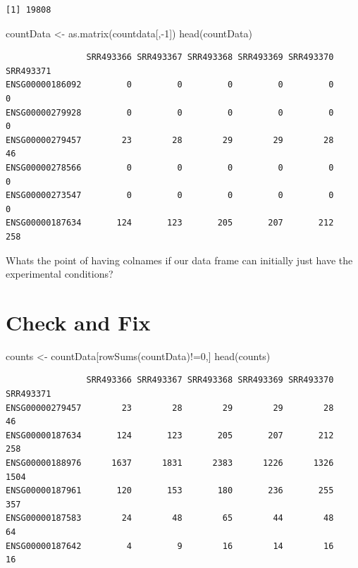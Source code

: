 \documentclass[
  letterpaper,
  DIV=11,
  numbers=noendperiod]{scrartcl}
\newenvironment{Shaded}{\begin{snugshade}}{\end{snugshade}}
\newcommand{\DecValTok}[1]{\textcolor[rgb]{0.68,0.00,0.00}{#1}}
\newcommand{\FunctionTok}[1]{\textcolor[rgb]{0.28,0.35,0.67}{#1}}
\newcommand{\NormalTok}[1]{\textcolor[rgb]{0.00,0.23,0.31}{#1}}
\newcommand{\OtherTok}[1]{\textcolor[rgb]{0.00,0.23,0.31}{#1}}
\newcommand{\SpecialCharTok}[1]{\textcolor[rgb]{0.37,0.37,0.37}{#1}}
\begin{document}
\begin{Shaded}
\end{Shaded}

\begin{verbatim}
[1] 19808
\end{verbatim}

\begin{Shaded}
\begin{Highlighting}[]
\NormalTok{countData }\OtherTok{\textless{}{-}} \FunctionTok{as.matrix}\NormalTok{(countdata[,}\SpecialCharTok{{-}}\DecValTok{1}\NormalTok{])}
\FunctionTok{head}\NormalTok{(countData)}
\end{Highlighting}
\end{Shaded}

\begin{verbatim}
                SRR493366 SRR493367 SRR493368 SRR493369 SRR493370 SRR493371
ENSG00000186092         0         0         0         0         0         0
ENSG00000279928         0         0         0         0         0         0
ENSG00000279457        23        28        29        29        28        46
ENSG00000278566         0         0         0         0         0         0
ENSG00000273547         0         0         0         0         0         0
ENSG00000187634       124       123       205       207       212       258
\end{verbatim}

Whats the point of having colnames if our data frame can initially just
have the experimental conditions?

\hypertarget{check-and-fix}{%
\section{Check and Fix}\label{check-and-fix}}

\begin{Shaded}
\begin{Highlighting}[]
\NormalTok{counts }\OtherTok{\textless{}{-}}\NormalTok{ countData[}\FunctionTok{rowSums}\NormalTok{(countData)}\SpecialCharTok{!=}\DecValTok{0}\NormalTok{,]}
\FunctionTok{head}\NormalTok{(counts)}
\end{Highlighting}
\end{Shaded}

\begin{verbatim}
                SRR493366 SRR493367 SRR493368 SRR493369 SRR493370 SRR493371
ENSG00000279457        23        28        29        29        28        46
ENSG00000187634       124       123       205       207       212       258
ENSG00000188976      1637      1831      2383      1226      1326      1504
ENSG00000187961       120       153       180       236       255       357
ENSG00000187583        24        48        65        44        48        64
ENSG00000187642         4         9        16        14        16        16
\end{verbatim}
\end{document}
